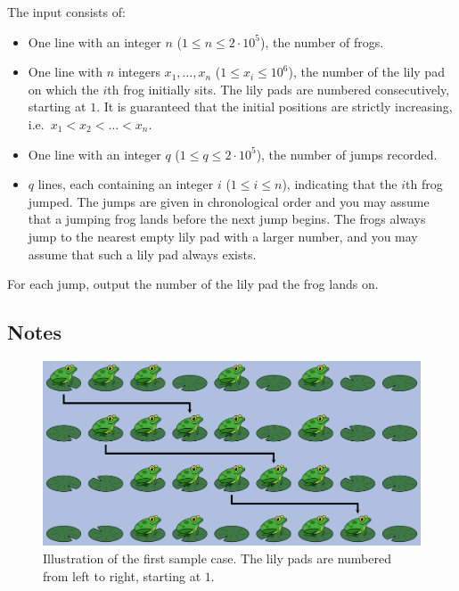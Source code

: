 \begin{Input}
	The input consists of:
	\begin{itemize}
		\item One line with an integer $n$ ($1\leq n \leq 2\cdot10^5$), the number of frogs.
		\item One line with $n$ integers $x_1,\dots, x_n$ ($1\leq x_i \leq 10^6$),
			the number of the lily pad on which the $i$th frog initially sits.
			The lily pads are numbered consecutively, starting at $1$. 
			It is guaranteed that the initial positions are strictly increasing, i.e.\
			$x_1 < x_2 < \dots < x_n$.
		\item One line with an integer $q$ ($1\leq q \leq 2\cdot10^5$), the
			number of jumps recorded.
		\item $q$ lines, each containing an integer $i$ ($1\leq i\leq n$), indicating
			that the $i$th frog jumped. The jumps are given in chronological
			order and you may assume that a jumping frog lands before the next
			jump begins.
			The frogs always jump to the nearest empty lily pad with a larger number,
			and you may assume that such a lily pad always exists.
	\end{itemize}
\end{Input}

\begin{Output}
	For each jump, output the number of the lily pad the frog lands on.
\end{Output}

\begin{afterSample}
  \section*{Notes}
	\begin{figure}[h]
		\centering
		\includegraphics[width=\textwidth]{sample}
		\caption{Illustration of the first sample case. The lily pads are
		numbered from left to right, starting at $1$.}
	\end{figure}
\end{afterSample}
